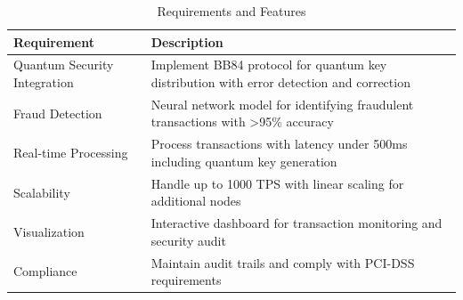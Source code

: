 \begin{table}[!htb]
\centering
\small
\begin{tabular}{|p{4.5cm}|p{9.5cm}|}
\hline
\cellcolor{lightblue!30}\textbf{Requirement} & \cellcolor{lightblue!30}\textbf{Description} \\
\hline
Quantum Security Integration & Implement BB84 protocol for quantum key distribution with error detection and correction \\
\hline
Fraud Detection & Neural network model for identifying fraudulent transactions with >95\% accuracy \\
\hline
Real-time Processing & Process transactions with latency under 500ms including quantum key generation \\
\hline
Scalability & Handle up to 1000 TPS with linear scaling for additional nodes \\
\hline
Visualization & Interactive dashboard for transaction monitoring and security audit \\
\hline
Compliance & Maintain audit trails and comply with PCI-DSS requirements \\
\hline
\end{tabular}
\caption{Requirements and Features}
\label{tab:requirements}
\end{table}